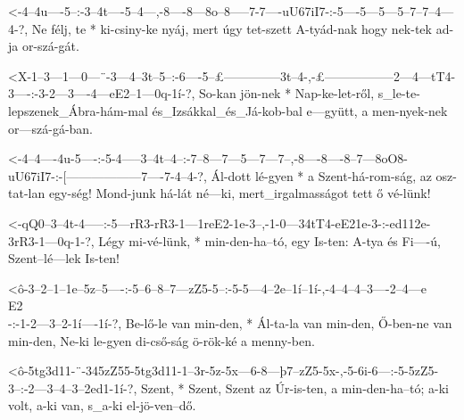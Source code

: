   {<-4--4u----5--:-3--4t----5--4---,-8----8---8o--8-----7-7----uU67iI7-:-5----5---5---5--7--7--4---4-?,}
  {  Ne félj, te * ki-csiny-ke nyáj, mert úgy tet-szett A-tyád-nak       hogy nek-tek ad-ja or-szá-gát.}

  {<X-1--3---1---0---¨-3---4--3t--5--:-6----5--£--------------3t--4-,-£-----------------2---4---tT4-3----:-3-2---3----4---eE2--1---0q-1í-?,}
  {   So-kan jön-nek * Nap-ke-let-ről, s_le-te-lepszenek_Ábra-hám-mal és_Izsákkal_és_Já-kob-bal e---gyütt, a men-nyek-nek or---szá-gá-ban.}




  {<-4--4----4u-5----:-5-4-----3--4t--4--:-7--8---7---5---7---7--,-8----8----8--7---8oO8-uU67iI7-:-[------------------7----7-4--4-?,}
  {  Ál-dott lé-gyen * a Szent-há-rom-ság, az osz-tat-lan egy-ség! Mond-junk há-lát né---ki,       mert_irgalmasságot tett ő vé-lünk!}


  {<-qQ0--3--4t-4-----:-5---rR3-rR3-1---1reE2-1e-3--,-1-0---34tT4-eE21e-3-:-ed112e-3rR3-1---0q-1-?,}
  {  Légy mi-vé-lünk, * min-den-ha--tó, egy   Is-ten: A-tya és    Fi----ú,  Szent--lé---lek Is-ten!}


  {<ô-3--2--1--1e--5z--5----:-5--6--8--7---zZ5-5--:-5-5---4--2e--1í--1í-,-4--4--4--3----2--4---e\\E2\\-:-1-2---3--2-1í----1í-?,}
  {   Be-lő-le van min-den, * Ál-ta-la van min-den, Ő-ben-ne van min-den, Ne-ki le-gyen di-cső-ság       ö-rök-ké a menny-ben.}


  {<ô-5tg3d11-¨-345zZ55-5tg3d11-1--3r-5z-5x---6-8---þ7--zZ5-5x-,-5-6i-6---:-5-5zZ5-3--:-2---3--4--3--2ed1-1í-?,}
  {   Szent,  * Szent,  Szent   az Úr-is-ten, a min-den-ha--tó;  a-ki volt, a-ki   van, s_a-ki el-jö-ven--dő.}

